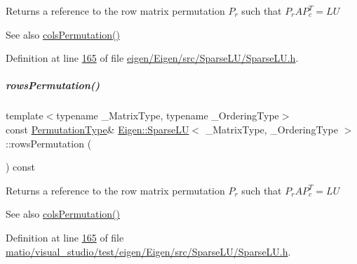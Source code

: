 \begin{DoxyReturn}{Returns}
a reference to the row matrix permutation $ P_r $ such that $P_r A P_c^T = L U$ 
\end{DoxyReturn}
\begin{DoxySeeAlso}{See also}
\hyperlink{group___sparse_l_u___module_ab7b0d15d0d9fd1faa164298f92ca59cd}{cols\+Permutation()} 
\end{DoxySeeAlso}


Definition at line \hyperlink{eigen_2_eigen_2src_2_sparse_l_u_2_sparse_l_u_8h_source_l00165}{165} of file \hyperlink{eigen_2_eigen_2src_2_sparse_l_u_2_sparse_l_u_8h_source}{eigen/\+Eigen/src/\+Sparse\+L\+U/\+Sparse\+L\+U.\+h}.

\mbox{\label{group___sparse_l_u___module_a691295e65c06df599876d78ac2c7fada}} 
\subparagraph{\texorpdfstring{rows\+Permutation()}{rowsPermutation()}\hspace{0.1cm}{\footnotesize\ttfamily [2/2]}}
{\footnotesize\ttfamily template$<$typename \+\_\+\+Matrix\+Type, typename \+\_\+\+Ordering\+Type$>$ \\
const \hyperlink{group___core___module}{Permutation\+Type}\& \hyperlink{group___sparse_l_u___module_class_eigen_1_1_sparse_l_u}{Eigen\+::\+Sparse\+LU}$<$ \+\_\+\+Matrix\+Type, \+\_\+\+Ordering\+Type $>$\+::rows\+Permutation (\begin{DoxyParamCaption}{ }\end{DoxyParamCaption}) const\hspace{0.3cm}{\ttfamily [inline]}}

\begin{DoxyReturn}{Returns}
a reference to the row matrix permutation $ P_r $ such that $P_r A P_c^T = L U$ 
\end{DoxyReturn}
\begin{DoxySeeAlso}{See also}
\hyperlink{group___sparse_l_u___module_ab7b0d15d0d9fd1faa164298f92ca59cd}{cols\+Permutation()} 
\end{DoxySeeAlso}


Definition at line \hyperlink{matio_2visual__studio_2test_2eigen_2_eigen_2src_2_sparse_l_u_2_sparse_l_u_8h_source_l00165}{165} of file \hyperlink{matio_2visual__studio_2test_2eigen_2_eigen_2src_2_sparse_l_u_2_sparse_l_u_8h_source}{matio/visual\+\_\+studio/test/eigen/\+Eigen/src/\+Sparse\+L\+U/\+Sparse\+L\+U.\+h}.

